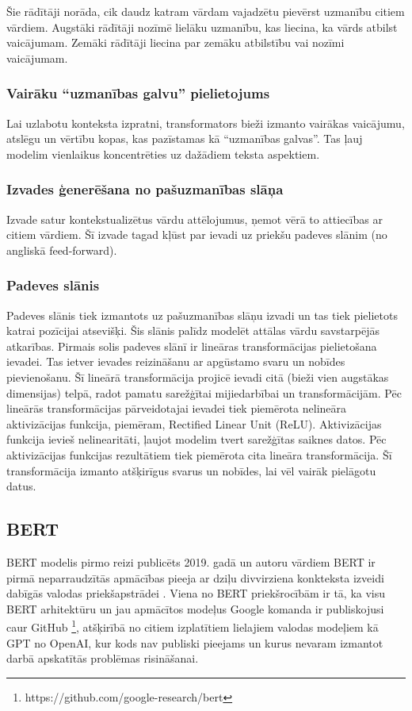 Šie rādītāji norāda, cik daudz katram vārdam vajadzētu pievērst uzmanību citiem vārdiem. Augstāki rādītāji nozīmē lielāku uzmanību, kas liecina, ka vārds atbilst vaicājumam. Zemāki rādītāji liecina par zemāku atbilstību vai nozīmi vaicājumam. 

\subsubsection{Vairāku “uzmanības galvu” pielietojums}

Lai uzlabotu konteksta izpratni, transformators bieži izmanto vairākas vaicājumu, atslēgu un vērtību kopas, kas pazīstamas kā “uzmanības galvas”. Tas ļauj modelim vienlaikus koncentrēties uz dažādiem teksta aspektiem.

\subsubsection{Izvades ģenerēšana no pašuzmanības slāņa}
Izvade satur kontekstualizētus vārdu attēlojumus, ņemot vērā to attiecības ar citiem vārdiem. Šī izvade tagad kļūst par ievadi uz priekšu padeves slānim (no angliskā feed-forward).

\subsubsection{Padeves slānis}
Padeves slānis tiek izmantots uz pašuzmanības slāņu izvadi un tas tiek pielietots katrai pozīcijai atsevišķi. Šis slānis palīdz modelēt attālas vārdu savstarpējās atkarības. Pirmais solis padeves slānī ir lineāras transformācijas pielietošana ievadei. Tas ietver ievades reizināšanu ar apgūstamo svaru un nobīdes pievienošanu. Šī lineārā transformācija projicē ievadi citā (bieži vien augstākas dimensijas) telpā, radot pamatu sarežģītai mijiedarbībai un transformācijām. Pēc lineārās transformācijas pārveidotajai ievadei tiek piemērota nelineāra aktivizācijas funkcija, piemēram, Rectified Linear Unit (ReLU). Aktivizācijas funkcija ievieš nelinearitāti, ļaujot modelim tvert sarežģītas saiknes datos. Pēc aktivizācijas funkcijas rezultātiem tiek piemērota cita lineāra transformācija. Šī transformācija izmanto atšķirīgus svarus un nobīdes, lai vēl vairāk pielāgotu datus.

\subsection{BERT}
BERT modelis pirmo reizi publicēts 2019. gadā un autoru vārdiem BERT ir pirmā neparraudzītās apmācības pieeja ar dziļu divvirziena konkteksta izveidi dabīgās valodas priekšapstrādei \cite{devlin2019bert}. Viena no BERT priekšrocībām ir tā, ka visu BERT arhitektūru un jau apmācītos modeļus Google komanda ir publiskojusi caur GitHub \footnote{https://github.com/google-research/bert}, atšķirībā no citiem izplatītiem lielajiem valodas modeļiem kā GPT no OpenAI, kur kods nav publiski pieejams un kurus nevaram izmantot darbā apskatītās problēmas risināšanai.

